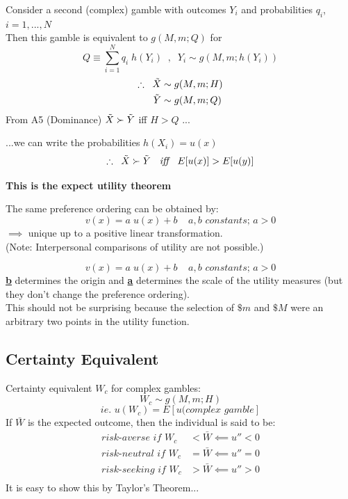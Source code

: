 \documentclass[
14pt,notheorems,hyperref={pdfauthor=whatever}
]{beamer}
\begin{document}
\begin{frame}
Consider a second (complex) gamble with outcomes $Y_i$ and probabilities $q_i$, $i=1,...,N$\\
Then this gamble is equivalent to $g(M,m;Q)$
for
\[Q \equiv \sum_{i=1}^N q_i\;h(Y_i)\;\;,\;\;Y_i\sim g(M,m;h(Y_i))\]
\begin{align*}
    \therefore \;\; \Tilde{X}&\sim g(M,m;H)\\
    \Tilde{Y}&\sim g(M,m;Q)\\
\end{align*}
From A5 (Dominance) $\Tilde{X} \succ \Tilde{Y}$ iff $H > Q$ ...
\end{frame}

\begin{frame}
...we can write the probabilities $h(X_i) = u(x)$\\
\[\therefore \;\; \Tilde{X}\succ\Tilde{Y}\;\; \textit{ iff }\;\; E[u(x)]>E[u(y)]\]
\begin{center}
    \textbf{This is the expect utility theorem}\\
\end{center}
\hfill \break
The same preference ordering can be obtained by:\\
\[v(x)=a\;u(x)+b \;\;\;\; a,b \textit{ constants; } a>0\]
$\implies$ unique up to a positive linear transformation.\\
(Note: Interpersonal comparisons of utility are not possible.)
\end{frame}

\begin{frame}
\[v(x)=a\;u(x)+b \;\;\;\; a,b \textit{ constants; } a>0\]
\hfill \break
\underline{\textbf{b}} determines the origin and \underline{\textbf{a}} determines the scale of the utility measures (but they don't change the preference ordering).\\
\hfill \break
This should not be surprising because the selection of $\$m$ and $\$M$ were an arbitrary two points in the utility function.
\end{frame}

\subsection{Certainty Equivalent}

\begin{frame}
Certainty equivalent $W_c$ for complex gambles:
\[W_c \sim g(M,m;H)\]
\[\textit{ie. } u(W_c) = E[u(\textit{complex gamble}]\]
\hfill \break
If $\bar{W}$ is the expected outcome, then the individual is said to be:
\begin{align*}
    \textit{risk-averse if } W_c &< \bar{W} \impliedby u''<0\\
    \textit{risk-neutral if } W_c &= \bar{W} \impliedby u''=0\\
    \textit{risk-seeking if } W_c &> \bar{W} \impliedby u''>0\\
\end{align*}
It is easy to show this by Taylor's Theorem...
\end{frame}
\end{document}
